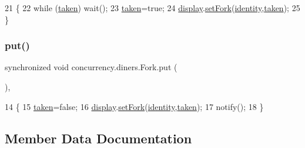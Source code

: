 \begin{DoxyCode}
21                                            \{
22     \textcolor{keywordflow}{while} (\mbox{\hyperlink{classconcurrency_1_1diners_1_1_fork_a875b343f95f6e3f07b2f2f5a5b83efb8}{taken}}) wait();
23     \mbox{\hyperlink{classconcurrency_1_1diners_1_1_fork_a875b343f95f6e3f07b2f2f5a5b83efb8}{taken}}=\textcolor{keyword}{true};
24     \mbox{\hyperlink{classconcurrency_1_1diners_1_1_fork_a7cb7b2dbd4bc84923557b292b10ac0a9}{display}}.\mbox{\hyperlink{classconcurrency_1_1diners_1_1_phil_canvas_a985316d908f267ebfe83d09c90e55e7a}{setFork}}(\mbox{\hyperlink{classconcurrency_1_1diners_1_1_fork_a27ae9a29dc069079538565c74931a0ef}{identity}},\mbox{\hyperlink{classconcurrency_1_1diners_1_1_fork_a875b343f95f6e3f07b2f2f5a5b83efb8}{taken}});
25   \}
\end{DoxyCode}
\mbox{\label{classconcurrency_1_1diners_1_1_fork_acff549ca1ca1540fa092ac44692624b5}} 
\subsubsection{\texorpdfstring{put()}{put()}}
{\footnotesize\ttfamily synchronized void concurrency.\+diners.\+Fork.\+put (\begin{DoxyParamCaption}{ }\end{DoxyParamCaption})\hspace{0.3cm}{\ttfamily [inline]}, {\ttfamily [package]}}


\begin{DoxyCode}
14                           \{
15     \mbox{\hyperlink{classconcurrency_1_1diners_1_1_fork_a875b343f95f6e3f07b2f2f5a5b83efb8}{taken}}=\textcolor{keyword}{false};
16     \mbox{\hyperlink{classconcurrency_1_1diners_1_1_fork_a7cb7b2dbd4bc84923557b292b10ac0a9}{display}}.\mbox{\hyperlink{classconcurrency_1_1diners_1_1_phil_canvas_a985316d908f267ebfe83d09c90e55e7a}{setFork}}(\mbox{\hyperlink{classconcurrency_1_1diners_1_1_fork_a27ae9a29dc069079538565c74931a0ef}{identity}},\mbox{\hyperlink{classconcurrency_1_1diners_1_1_fork_a875b343f95f6e3f07b2f2f5a5b83efb8}{taken}});
17     notify();
18   \}
\end{DoxyCode}


\subsection{Member Data Documentation}
\mbox{\label{classconcurrency_1_1diners_1_1_fork_a7cb7b2dbd4bc84923557b292b10ac0a9}} 
